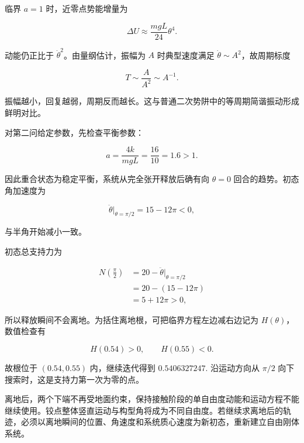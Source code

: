 \documentclass[12pt,a4paper,UTF8]{ctexart}
\begin{document}
临界 \(a=1\) 时，近零点势能增量为

\[\Delta U\approx\frac{mgL}{24}\theta^4.\]

动能仍正比于 \(\dot\theta^2\)。由量纲估计，振幅为 \(A\) 时典型速度满足
\(\dot\theta\sim A^2\)，故周期标度

\[T\sim\frac{A}{A^2}\sim A^{-1}.\]

振幅越小，回复越弱，周期反而越长。这与普通二次势阱中的等周期简谐振动形成鲜明对比。

对第二问给定参数，先检查平衡参数：

\[a=\frac{4k}{mgL}=\frac{16}{10}=1.6>1.\]

因此重合状态为稳定平衡，系统从完全张开释放后确有向 \(\theta=0\)
回合的趋势。初态角加速度为

\[\ddot\theta\bigg|_{\theta=\pi/2}=15-12\pi<0,\]

与半角开始减小一致。

初态总支持力为

\[\begin{aligned}
N\left(\frac\pi2\right)
&=20-\ddot\theta\bigg|_{\theta=\pi/2}\\
&=20-(15-12\pi)\\
&=5+12\pi>0,
\end{aligned}\]

所以释放瞬间不会离地。为括住离地根，可把临界方程左边减右边记为
\(H(\theta)\)，数值检查有

\[H(0.54)>0,\qquad H(0.55)<0.\]

故根位于 \((0.54,0.55)\) 内，继续迭代得到 \(0.5406327247\). 沿运动方向从
\(\pi/2\) 向下搜索时，这是支持力第一次为零的点。

离地后，两个下端不再受地面约束，保持接触阶段的单自由度动能和运动方程不能继续使用。铰点整体竖直运动与构型角将成为不同自由度。若继续求离地后的轨迹，必须以离地瞬间的位置、角速度和系统质心速度为新初态，重新建立自由刚体系统。
\end{document}

